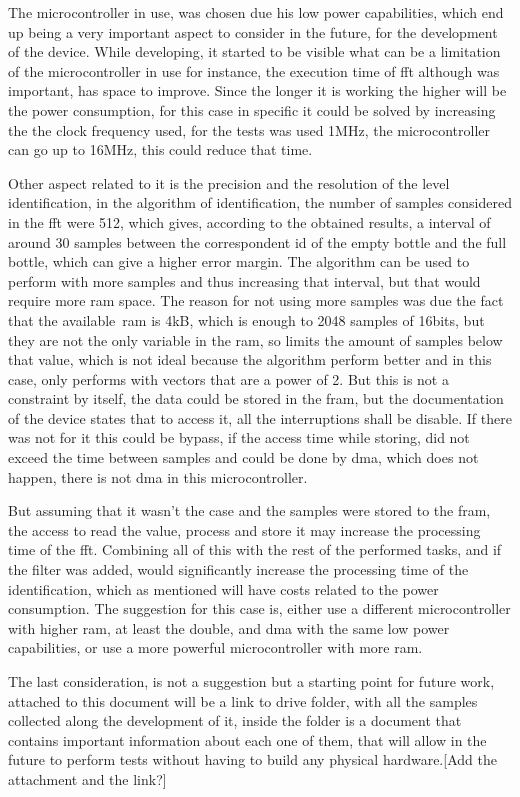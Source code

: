 The microcontroller in use, was chosen due his low power capabilities, which end up being a very important aspect to consider in the future, for the development of the device. While developing, it started to be visible what can be a limitation of the microcontroller in use for instance, the execution time of \acrshort{fft} although was important, has space to improve. Since the longer it is working the higher will be the power consumption, for this case in specific it could be solved by increasing the the clock frequency used, for the tests was used 1MHz, the microcontroller can go up to 16MHz, this could reduce that time. 

Other aspect related to it is the precision and the resolution of the level identification, in the algorithm of identification, the number of samples considered in the \acrshort{fft} were 512, which gives, according to the obtained results, a interval of around 30 samples between the correspondent id of the empty bottle and the full bottle, which can give a higher error margin. The algorithm can be used to perform with more samples and thus increasing that interval, but that would require more \acrshort{ram} space. The reason for not using more samples was due the fact that the available~\acrshort{ram} is 4kB, which is enough to 2048 samples of 16bits, but they are not the only variable in the \acrshort{ram}, so limits the amount of samples below that value, which is not ideal because the algorithm perform better and in this case, only performs with vectors that are a power of 2. But this is not a constraint by itself, the data could be stored in the \acrshort{fram}, but the documentation of the device states that to access it, all the interruptions shall be disable. If there was not for it this could be bypass, if the access time while storing, did not exceed the time between samples and could be done by \acrshort{dma}, which does not happen, there is not \acrshort{dma} in this microcontroller.

But assuming that it wasn't the case and the samples were stored to the \acrshort{fram}, the access to read the value, process and store it may increase the processing time of the \acrshort{fft}. Combining all of this with the rest of the performed tasks, and if the filter was added, would significantly increase the processing time of the identification, which as mentioned will have costs related to the power consumption. The suggestion for this case is, either use a different microcontroller with higher \acrshort{ram}, at least the double, and \acrshort{dma} with the same low power capabilities, or use a more powerful microcontroller with more \acrshort{ram}.

The last consideration, is not a suggestion but a starting point for future work, attached to this document will be a link to drive folder, with all the samples collected along the development of it, inside the folder is a document that contains important information about each one of them, that will allow in the future to perform tests without having to build any physical hardware.[Add the attachment and the link?]


